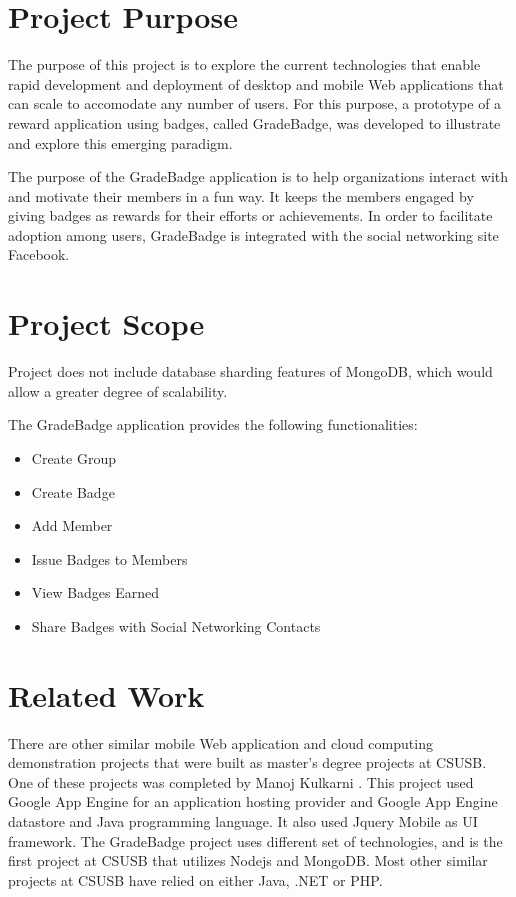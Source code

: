 \section{Project Purpose}
The purpose of this project is to explore the current technologies that enable rapid development and deployment of desktop and mobile Web applications that can scale to accomodate any number of users.  For this purpose, a prototype of a reward application using badges, called GradeBadge, was developed to illustrate and explore this emerging paradigm.

The purpose of the GradeBadge application is to help organizations interact with and motivate their members in a fun way. It keeps the members engaged by giving badges as rewards for their efforts or achievements. In order to facilitate adoption among users, GradeBadge is integrated with the social networking site Facebook.

\section{Project Scope}
Project does not include database sharding features of MongoDB, which would allow a greater degree of scalability.

The GradeBadge application provides the following functionalities:
\begin{itemize}
\item Create Group
\item Create Badge 
\item Add Member
\item Issue Badges to Members
\item View Badges Earned
\item Share Badges with Social Networking Contacts
\end{itemize}

\section{Related Work}
There are other similar mobile Web application and cloud computing demonstration projects that were built as master's degree projects at CSUSB.  One of these projects was completed by Manoj Kulkarni \cite{Manoj}.  This project used Google App Engine for an application hosting provider and Google App Engine datastore and Java programming language. It also used Jquery Mobile as UI framework. The GradeBadge project uses different set of technologies, and is the first project at CSUSB that utilizes Nodejs and MongoDB.  Most other similar projects at CSUSB have relied on either Java, .NET or PHP.

